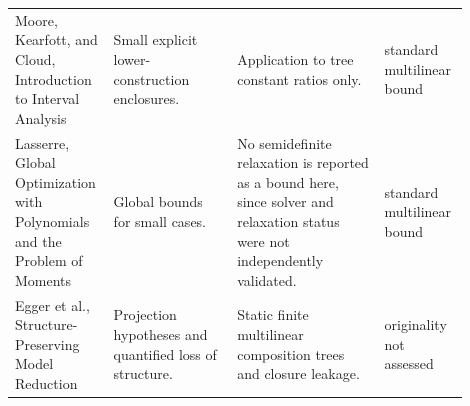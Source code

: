 \begin{tabular}{@{}>{\raggedright\arraybackslash}p{0.17\linewidth}>{\raggedright\arraybackslash}p{0.26\linewidth}>{\raggedright\arraybackslash}p{0.31\linewidth}>{\raggedright\arraybackslash}p{0.16\linewidth}@{}}
Moore, Kearfott, and Cloud, Introduction to Interval Analysis & Small explicit lower-construction enclosures. & Application to tree constant ratios only. & standard multilinear bound \\
Lasserre, Global Optimization with Polynomials and the Problem of Moments & Global bounds for small cases. & No semidefinite relaxation is reported as a bound here, since solver and relaxation status were not independently validated. & standard multilinear bound \\
Egger et al., Structure-Preserving Model Reduction & Projection hypotheses and quantified loss of structure. & Static finite multilinear composition trees and closure leakage. & originality not assessed \\
\bottomrule
\end{tabular}


